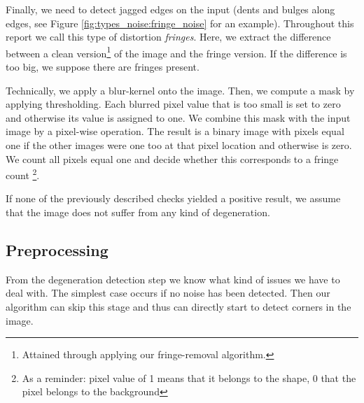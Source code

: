 \documentclass[conference]{IEEEtran}
\begin{document}
Finally, we need to detect jagged edges on the input (dents and bulges along edges, see Figure \ref{fig:types_noise:fringe_noise} for an example). 
Throughout this report we call this type of distortion \emph{fringes}. 
Here, we extract the difference between a clean version\footnote{Attained through applying our fringe-removal algorithm.} of the image and the fringe version. 
If the difference is too big, we suppose there are fringes present. 
	
Technically, we apply a blur-kernel onto the image. Then, we compute a mask by applying thresholding. 
Each blurred pixel value that is too small is set to zero and otherwise its value is assigned to one. 
We combine this mask with the input image by a pixel-wise operation. 
The result is a binary image with pixels equal one if the other images were one too at that pixel location and otherwise is zero. 
We count all pixels equal one and decide whether this corresponds to a fringe count \footnote{As a reminder: pixel value of 1 means that it belongs to the shape, 0 that the pixel belongs to the background}.
 
If none of the previously described checks yielded a positive result, 
we assume that the image does not suffer from any kind of degeneration.
  
\subsection{Preprocessing}
From the degeneration detection step we know what kind of issues we have to deal with. 
The simplest case occurs if no noise has been detected. 
Then our algorithm can skip this stage and thus can directly start to detect corners in the image. 
\end{document}

